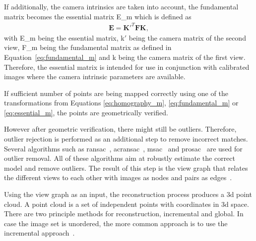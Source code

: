 If additionally, the camera intrinsics are taken into account, the fundamental matrix becomes the essential matrix \gls{E_m} which is defined as
\begin{align}
    \textbf{E} = \textbf{K}'^{T}\textbf{F}\textbf{K}, \label{eq:essential_m}
\end{align}
with \gls{E_m} being the essential matrix, \gls{k}$'$ being the camera matrix of the second view, \gls{F_m} being the fundamental matrix as defined in Equation~\ref{eq:fundamental_m} and \gls{k} being the camera matrix of the first view. Therefore, the essential matrix is intended for use in conjunction with calibrated images where the camera intrinsic parameters are available.

If sufficient number of points are being mapped correctly using one of the transformations from Equations \ref{eq:homography_m}, \ref{eq:fundamental_m} or \ref{eq:essential_m}, the points are geometrically verified.

However after geometric verification, there might still be outliers. Therefore, outlier rejection is performed as an additional step to remove incorrect matches. Several algorithms such as \gls{ransac}~\cite{Fischler1981RandomCartography}, \gls{acransac}~\cite{moisan2012automatic}, \gls{msac}~\cite{wang2009generalized} and \gls{prosac}~\cite{Chum2005MatchingConsensus} are used for outlier removal. All of these algorithms aim at robustly estimate the correct model and remove outliers. The result of this step is the view graph that relates the different views to each other with images as nodes and pairs as edges~\cite{schonberger2016structure}.

Using the view graph as an input, the reconstruction process produces a \gls{3d} point cloud. A point cloud is a set of independent points with coordinates in \gls{3d} space. There are two principle methods for reconstruction, incremental and global. In case the image set is unordered, the more common approach is to use the incremental approach~\cite{schonberger2016structure}.

